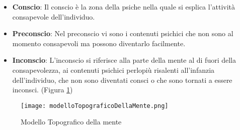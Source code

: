 \documentclass{subfiles}
\begin{document}
\begin{itemize}
    \item \textbf{Conscio}: Il conscio è la zona della psiche nella quale si esplica l'attività 
    consapevole dell'individuo.
    \item \textbf{Preconscio}: Nel preconscio vi sono i contenuti psichici che non sono al 
    momento consapevoli ma possono diventarlo facilmente.
    \item \textbf{Inconscio}: L'inconscio si riferisce alla parte della mente al di fuori della 
    consapevolezza, ai contenuti psichici perlopiù risalenti all'infanzia dell'individuo, 
    che non sono diventati consci o che sono tornati a essere inconsci. 
    (Figura \ref{Modello Topografico della mente})
\end{itemize}

\begin{figure}[ht]
    \centering
    \texttt{[image: modelloTopograficoDellaMente.png]}
    \caption{Modello Topografico della mente}
    \label{Modello Topografico della mente}
\end{figure}

\clearpage
\end{document}
